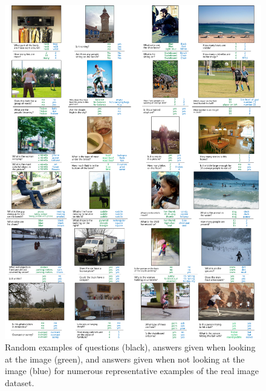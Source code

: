 \begin{figure}[t]
\centering
\includegraphics[width=1\linewidth]{figures/coco_examples-compressed.pdf}
\caption{Random examples of questions (black),  answers given when looking at the image (green), and answers given when not looking at the image (blue) for numerous representative examples of the real image dataset.}
\label{fig:coco_more_examples}
\end{figure}

